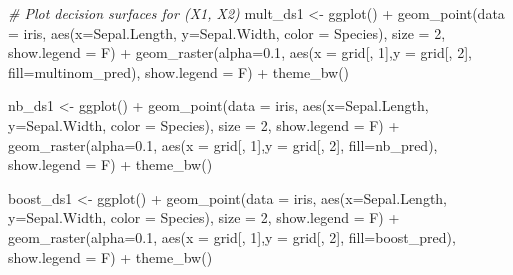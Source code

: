 \documentclass[
]{article}
\newenvironment{Shaded}{\begin{snugshade}}{\end{snugshade}}
\newcommand{\AttributeTok}[1]{\textcolor[rgb]{0.77,0.63,0.00}{#1}}
\newcommand{\CommentTok}[1]{\textcolor[rgb]{0.56,0.35,0.01}{\textit{#1}}}
\newcommand{\DecValTok}[1]{\textcolor[rgb]{0.00,0.00,0.81}{#1}}
\newcommand{\FloatTok}[1]{\textcolor[rgb]{0.00,0.00,0.81}{#1}}
\newcommand{\FunctionTok}[1]{\textcolor[rgb]{0.00,0.00,0.00}{#1}}
\newcommand{\NormalTok}[1]{#1}
\newcommand{\OtherTok}[1]{\textcolor[rgb]{0.56,0.35,0.01}{#1}}
\newcommand{\SpecialCharTok}[1]{\textcolor[rgb]{0.00,0.00,0.00}{#1}}
\begin{document}
\begin{Shaded}
\begin{Highlighting}[]
\CommentTok{\# Plot decision surfaces for (X1, X2)}
\NormalTok{mult\_ds1 }\OtherTok{\textless{}{-}} \FunctionTok{ggplot}\NormalTok{() }\SpecialCharTok{+} 
  \FunctionTok{geom\_point}\NormalTok{(}\AttributeTok{data =}\NormalTok{ iris, }\FunctionTok{aes}\NormalTok{(}\AttributeTok{x=}\NormalTok{Sepal.Length, }\AttributeTok{y=}\NormalTok{Sepal.Width, }\AttributeTok{color =}\NormalTok{ Species), }\AttributeTok{size =} \DecValTok{2}\NormalTok{, }\AttributeTok{show.legend =}\NormalTok{ F) }\SpecialCharTok{+}
  \FunctionTok{geom\_raster}\NormalTok{(}\AttributeTok{alpha=}\FloatTok{0.1}\NormalTok{, }\FunctionTok{aes}\NormalTok{(}\AttributeTok{x =}\NormalTok{ grid[, }\DecValTok{1}\NormalTok{],}\AttributeTok{y =}\NormalTok{ grid[, }\DecValTok{2}\NormalTok{], }\AttributeTok{fill=}\NormalTok{multinom\_pred), }\AttributeTok{show.legend =}\NormalTok{ F) }\SpecialCharTok{+}
  \FunctionTok{theme\_bw}\NormalTok{()}

\NormalTok{nb\_ds1 }\OtherTok{\textless{}{-}} \FunctionTok{ggplot}\NormalTok{() }\SpecialCharTok{+} 
  \FunctionTok{geom\_point}\NormalTok{(}\AttributeTok{data =}\NormalTok{ iris, }\FunctionTok{aes}\NormalTok{(}\AttributeTok{x=}\NormalTok{Sepal.Length, }\AttributeTok{y=}\NormalTok{Sepal.Width, }\AttributeTok{color =}\NormalTok{ Species), }\AttributeTok{size =} \DecValTok{2}\NormalTok{, }\AttributeTok{show.legend =}\NormalTok{ F) }\SpecialCharTok{+}
  \FunctionTok{geom\_raster}\NormalTok{(}\AttributeTok{alpha=}\FloatTok{0.1}\NormalTok{, }\FunctionTok{aes}\NormalTok{(}\AttributeTok{x =}\NormalTok{ grid[, }\DecValTok{1}\NormalTok{],}\AttributeTok{y =}\NormalTok{ grid[, }\DecValTok{2}\NormalTok{], }\AttributeTok{fill=}\NormalTok{nb\_pred), }\AttributeTok{show.legend =}\NormalTok{ F) }\SpecialCharTok{+}
  \FunctionTok{theme\_bw}\NormalTok{()}

\NormalTok{boost\_ds1 }\OtherTok{\textless{}{-}} \FunctionTok{ggplot}\NormalTok{() }\SpecialCharTok{+} 
  \FunctionTok{geom\_point}\NormalTok{(}\AttributeTok{data =}\NormalTok{ iris, }\FunctionTok{aes}\NormalTok{(}\AttributeTok{x=}\NormalTok{Sepal.Length, }\AttributeTok{y=}\NormalTok{Sepal.Width, }\AttributeTok{color =}\NormalTok{ Species), }\AttributeTok{size =} \DecValTok{2}\NormalTok{, }\AttributeTok{show.legend =}\NormalTok{ F) }\SpecialCharTok{+}
  \FunctionTok{geom\_raster}\NormalTok{(}\AttributeTok{alpha=}\FloatTok{0.1}\NormalTok{, }\FunctionTok{aes}\NormalTok{(}\AttributeTok{x =}\NormalTok{ grid[, }\DecValTok{1}\NormalTok{],}\AttributeTok{y =}\NormalTok{ grid[, }\DecValTok{2}\NormalTok{], }\AttributeTok{fill=}\NormalTok{boost\_pred), }\AttributeTok{show.legend =}\NormalTok{ F) }\SpecialCharTok{+}
  \FunctionTok{theme\_bw}\NormalTok{()}




\end{Highlighting}
\end{Shaded}
\end{document}
